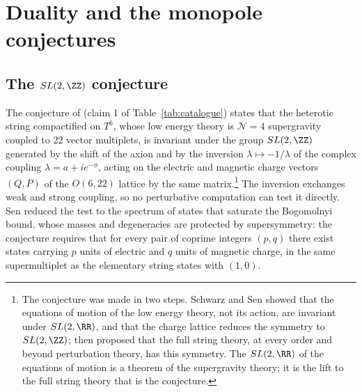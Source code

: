 \section{Duality and the monopole conjectures}\label{sec:sduality}

\subsection{The $SL(2,\ZZ)$ conjecture}\label{ssec:sl2z}

The conjecture of \cite{Sen94duality} (claim 1 of Table~\ref{tab:catalogue}) states that the heterotic string compactified on $T^6$, whose low energy theory is $\mathcal N=4$ supergravity coupled to 22 vector multiplets, is invariant under the group $SL(2,\ZZ)$ generated by the shift of the axion and by the inversion $\lambda\mapsto -1/\lambda$ of the complex coupling $\lambda = a + i e^{-\phi}$, acting on the electric and magnetic charge vectors $(Q,P)$ of the $O(6,22)$ lattice by the same matrix.\footnote{The conjecture was made in two steps. Schwarz and Sen \cite{SchwarzSen93} showed that the equations of motion of the low energy theory, not its action, are invariant under $SL(2,\RR)$, and that the charge lattice reduces the symmetry to $SL(2,\ZZ)$; \cite{Sen94duality} then proposed that the full string theory, at every order and beyond perturbation theory, has this symmetry. The $SL(2,\RR)$ of the equations of motion is a theorem of the supergravity theory; it is the lift to the full string theory that is the conjecture.} The inversion exchanges weak and strong coupling, so no perturbative computation can test it directly. Sen reduced the test to the spectrum of states that saturate the Bogomolnyi bound, whose masses and degeneracies are protected by supersymmetry: the conjecture requires that for every pair of coprime integers $(p,q)$ there exist states carrying $p$ units of electric and $q$ units of magnetic charge, in the same supermultiplet as the elementary string states with $(1,0)$.

